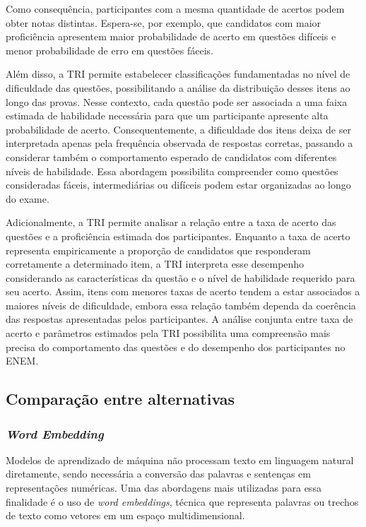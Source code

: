 \documentclass[a4paper,10pt, twocolumn]{article}
\begin{document}
Como consequência, participantes com a mesma quantidade de acertos podem obter notas distintas. Espera-se, por exemplo, que candidatos com maior proficiência apresentem maior probabilidade de acerto em questões difíceis e menor probabilidade de erro em questões fáceis.

Além disso, a TRI permite estabelecer classificações fundamentadas no nível de dificuldade das questões, possibilitando a análise da distribuição desses itens ao longo das provas. Nesse contexto, cada questão pode ser associada a uma faixa estimada de habilidade necessária para que um participante apresente alta probabilidade de acerto. Consequentemente, a dificuldade dos itens deixa de ser interpretada apenas pela frequência observada de respostas corretas, passando a considerar também o comportamento esperado de candidatos com diferentes níveis de habilidade. Essa abordagem possibilita compreender como questões consideradas fáceis, intermediárias ou difíceis podem estar organizadas ao longo do exame.

Adicionalmente, a TRI permite analisar a relação entre a taxa de acerto das questões e a proficiência estimada dos participantes. Enquanto a taxa de acerto representa empiricamente a proporção de candidatos que responderam corretamente a determinado item, a TRI interpreta esse desempenho considerando as características da questão e o nível de habilidade requerido para seu acerto. Assim, itens com menores taxas de acerto tendem a estar associados a maiores níveis de dificuldade, embora essa relação também dependa da coerência das respostas apresentadas pelos participantes. A análise conjunta entre taxa de acerto e parâmetros estimados pela TRI possibilita uma compreensão mais precisa do comportamento das questões e do desempenho dos participantes no ENEM.

\subsection{Comparação entre alternativas}
\subsubsection{\textit{Word Embedding}}
Modelos de aprendizado de máquina não processam texto em linguagem natural diretamente, sendo necessária a conversão das palavras e sentenças em representações numéricas. Uma das abordagens mais utilizadas para essa finalidade é o uso de \textit{word embeddings}, técnica que representa palavras ou trechos de texto como vetores em um espaço multidimensional.
\end{document}

